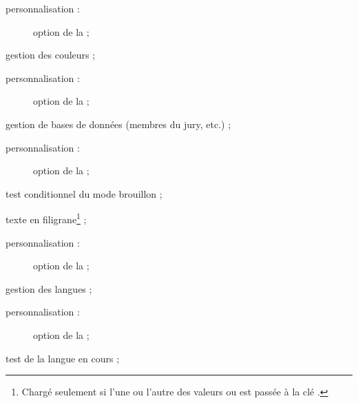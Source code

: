 \begin{description}
\begin{description}
  \item[personnalisation :] option  de la \yatcl ;
  \end{description}
\item[\package*{xcolor} :] gestion des couleurs ;
  \begin{description}
  \item[personnalisation :] option  de la \yatcl ;
  \end{description}
\item[\package{datatool} :] gestion de bases de données (membres du jury,
  etc.) ;
  \begin{description}
  \item[personnalisation :] option  de la \yatcl ;
  \end{description}
\item[\package{ifdraft} :] test conditionnel du mode brouillon ;
\item[\package*{draftwatermark} :] texte en filigrane\footnote{Chargé seulement
    si l'une ou l'autre des valeurs  ou 
    est passée à la clé .} ;
  \begin{description}
  \item[personnalisation :] option  de la \yatcl ;
  \end{description}
\item[\package*{babel} :] gestion des langues ;
  \begin{description}
  \item[personnalisation :] option  de la \yatcl ;
  \end{description}
\item[\package{iflang} :] test de la langue en cours ;

\end{description}
